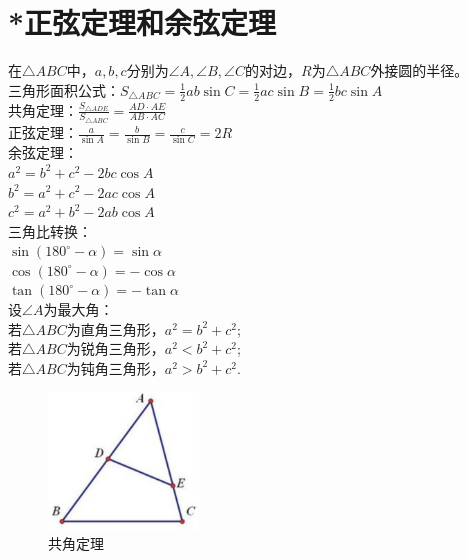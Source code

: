 \documentclass{ecnuthesis}
\begin{document}
\section{*正弦定理和余弦定理}
\begin{knowledge}
    在$\triangle ABC$中，$a,b,c$分别为$\angle A,\angle B,\angle C$的对边，$R$为$\triangle ABC$外接圆的半径。 \\
    三角形面积公式：$S_{\triangle ABC}=\frac{1}{2}ab\sin C=\frac{1}{2}ac\sin B=\frac{1}{2}bc\sin A$ \\
    共角定理：$\frac{S_{\triangle ADE}}{S_{\triangle ABC}}=\frac{AD·AE}{AB·AC}$ \\
    正弦定理：$\frac{a}{\sin A}=\frac{b}{\sin B}=\frac{c}{\sin C}=2R$ \\
    余弦定理：\\
    $a^2=b^2+c^2-2bc\cos A$ \\
    $b^2=a^2+c^2-2ac\cos A$ \\
    $c^2=a^2+b^2-2ab\cos A$ \\
    三角比转换：\\
    $\sin(180^\circ - \alpha)=\sin \alpha$ \\
    $\cos(180^\circ - \alpha)=-\cos \alpha$ \\
    $\tan(180^\circ - \alpha)=-\tan \alpha$ \\
    设$\angle A$为最大角：\\
    若$\triangle ABC$为直角三角形，$a^2=b^2+c^2$; \\
    若$\triangle ABC$为锐角三角形，$a^2<b^2+c^2$; \\
    若$\triangle ABC$为钝角三角形，$a^2>b^2+c^2$. \\
\end{knowledge}
\begin{figure}[H]
\centering
\includegraphics[width=4cm]{picture/902.png}
\caption{共角定理}
\end{figure}
\clearpage
\end{document}
